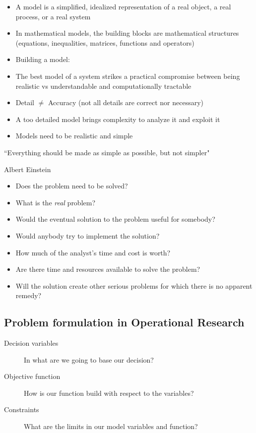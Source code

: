   \begin{itemize}
    \item A model is a simplified, idealized representation of a real object, a real process, or a real system
    \item In mathematical models, the building blocks are mathematical structures (equations, inequalities, matrices, functions and operators)
    \item Building a model:
          
  \end{itemize}



  \begin{itemize}
    \item The best model of a system strikes a practical compromise between being realistic vs understandable and computationally tractable
    \item Detail $\neq$ Accuracy (not all details are correct nor necessary)
    \item A too detailed model brings complexity to analyze it and exploit it
    \item Models need to be realistic and simple
  \end{itemize}
  \epigraph{``Everything should be made as simple as possible, but not simpler"}{Albert Einstein}




  \begin{itemize}
    \item Does the problem need to be solved?
    \item What is the {\it real} problem?
    \item Would the eventual solution to the problem useful for somebody?
    \item Would anybody try to implement the solution?
    \item How much of the analyst's time and cost is worth?
    \item Are there time and resources available to solve the problem?
    \item Will the solution create other serious problems for which there is no apparent remedy?
  \end{itemize}


\subsection{Problem formulation in Operational Research}

      \begin{description}
        \item[Decision variables] In what are we going to base our decision?
        \item[Objective function] How is our function build with respect to the variables?
        \item[Constraints] What are the limits in our model variables and function?
      \end{description}

